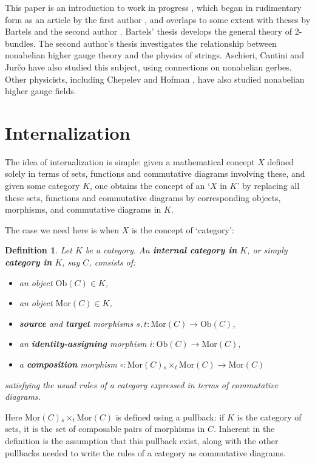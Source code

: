 \documentclass{article}
\newcommand{\maps}{\colon}
\newcommand{\Ob}{\mathrm{Ob}}
\newcommand{\Mor}{\mathrm{Mor}}
\newtheorem{definition}[theorem]{Definition}
\newcommand{\et}{\hspace{-0.08in}{\bf .}\hspace{0.1in}}
\def\id {i}
\begin{document}
This paper is an introduction to work in progress \cite{BaezSchreiber:2004},
which began in rudimentary form as an article by the first author
\cite{Baez:2002}, and overlaps to some extent with theses by 
Bartels \cite{Bartels:2004} and the second author
\cite{Schreiber:2005}.  Bartels' thesis develops the general
theory of 2-bundles.  The second author's thesis investigates the
relationship between nonabelian higher gauge theory and the physics 
of strings.  Aschieri, Cantini and Jur{\v c}o 
\cite{AschieriCantiniJurco:2003,AschieriJurco:2004} have
also studied this subject, using connections on nonabelian gerbes.
Other physicists, including Chepelev \cite{Chepelev:2002} and Hofman 
\cite{Hofman:2002}, have also studied nonabelian higher gauge fields.

\section{Internalization}
\label{section: Internalization}

The idea of internalization is simple: given a mathematical concept $X$ 
defined solely in terms of sets, functions and commutative diagrams 
involving these, and given some category $K$, one obtains the concept of 
an `$X$ in $K$' by replacing all these sets, functions and commutative
diagrams by corresponding objects, morphisms, and commutative diagrams
in $K$.  

The case we need here is when $X$ is the concept of `category':

\begin{definition} \et 
Let $K$ be a category.  
An {\bf internal category in} $K$, or simply
{\bf category in} $K$, say $C$, consists of: 
\begin{itemize}
\item an object $\Ob(C) \in K$,
\item an object $\Mor(C) \in K$,
\item {\bf source} and {\bf target} morphisms
$s,t \maps \Mor(C) \to \Ob(C)$,
\item an {\bf identity-assigning} morphism
$\id \maps \Ob(C) \to \Mor(C)$,
\item a {\bf composition} morphism
$\circ \maps \Mor(C) {{}_{s}\times_{t}} 
\Mor(C) \to \Mor(C)$
\end{itemize}
satisfying the usual rules of a category expressed in terms of commutative
diagrams.
\end{definition}

\noindent Here $\Mor(C) {{}_{s}\times_{t}} \Mor(C)$ is defined using a
pullback: if $K$ is the category of sets, it is the set of composable
pairs of morphisms in $C$.  Inherent in the definition is the
assumption that this pullback exist, along with the other pullbacks
needed to write the rules of a category as commutative diagrams.
\end{document}
